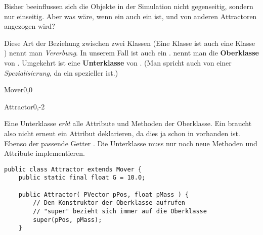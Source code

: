 \documentclass[9pt, a4paper, ngerman]{arbeitsblatt}
\begin{document}
\newpage
\begin{aufgabe}[subtitle=Vererbungsbeziehungen,icon=\iconComputer]
\label{aufg:vererbung}
\begin{links}[.7]
Bisher beeinflussen sich die Objekte in der Simulation nicht gegenseitig, sondern nur einseitig. Aber was wäre, wenn ein  auch ein  ist, und von anderen Attractoren angezogen wird?

Diese Art der Beziehung zwischen zwei Klassen (Eine Klasse  ist auch eine Klasse ) nennt man \emph{Vererbung}. In unserem Fall ist  auch ein .  nennt man die \textbf{Oberklasse} von . Umgekehrt ist  eine \textbf{Unterklasse} von . (Man spricht auch von einer \emph{Spezialisierung}, da  ein spezieller  ist.)
\end{links}\begin{rechts}[.3]\centering
	\begin{klassendiagramm}%
		\begin{class}[text width=4cm]{Mover}{0,0}

		\end{class}
		\begin{class}[text width=4cm]{Attractor}{0,-2}
		\end{class}
	\end{klassendiagramm}
\end{rechts}

Eine Unterklasse \emph{erbt} alle Attribute und Methoden der Oberklasse. Ein  braucht also nicht erneut ein Attribut  deklarieren, da dies ja schon in  vorhanden ist. Ebenso der passende Getter . Die Unterklasse muss nur noch neue Methoden und Attribute implementieren.
\begin{verbatim}
public class Attractor extends Mover {
	public static final float G = 10.0;

	public Attractor( PVector pPos, float pMass ) {
		// Den Konstruktor der Oberklasse aufrufen
		// "super" bezieht sich immer auf die Oberklasse
		super(pPos, pMass);
	}


\end{verbatim}
\end{aufgabe}
\end{document}

